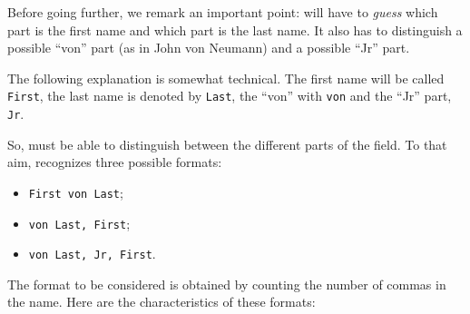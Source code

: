Before going further, we remark an important point: \bt will have to
\emph{guess} which part is the first name and which part is the last
name. It also has to distinguish a possible ``von'' part (as in John
von Neumann) and a possible ``Jr'' part.

The following explanation is somewhat technical. The first name will
be called \verb+First+, the last name is denoted by \verb+Last+, the
``von'' with \verb+von+ and the ``Jr'' part, \verb+Jr+.


So, \bt must be able to distinguish between the different parts of the
 field. To that aim, \bt recognizes three
possible formats:
\begin{itemize}
\item \verb+First von Last+; 
\item \verb+von Last, First+;
\item \verb+von Last, Jr, First+.
\end{itemize}

The format to be considered is obtained by counting the number of
commas in the name.
 Here are the characteristics of these formats:

